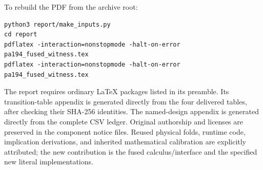 To rebuild the PDF from the archive root:
\begin{verbatim}
python3 report/make_inputs.py
cd report
pdflatex -interaction=nonstopmode -halt-on-error pa194_fused_witness.tex
pdflatex -interaction=nonstopmode -halt-on-error pa194_fused_witness.tex
\end{verbatim}
The report requires ordinary LaTeX packages listed in its preamble. Its
transition-table appendix is generated directly from the four delivered
tables, after checking their SHA-256 identities. The named-design appendix
is generated directly from the complete CSV ledger. Original authorship
and licenses are preserved in the component notice files. Reused physical
folds, runtime code, implication derivations, and inherited mathematical
calibration are explicitly attributed; the new contribution is the fused
calculus/interface and the specified new literal implementations.
